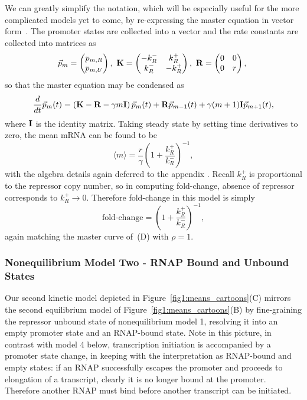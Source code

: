 We can greatly simplify the notation, which will be especially useful for the
more complicated models yet to come, by re-expressing the master equation in
vector form~\cite{Phillips2012}. The promoter states are collected into a vector
and the rate constants are collected into matrices as
\begin{equation}
\vec{p}_m = \begin{pmatrix} p_{m,R} \\ p_{m,U} \end{pmatrix},\
\mathbf{K} = \begin{pmatrix} -k_R^- & k_R^+ \\ k_R^- & -k_R^+ \end{pmatrix},\
\mathbf{R} = \begin{pmatrix} 0 & 0 \\ 0 & r \end{pmatrix},\
\label{eq:2state_cme_matrices}
\end{equation}
so that the master equation may be condensed as
\begin{equation}
\frac{d {}}{d t}\vec{p}_m(t) =
\left( \mathbf{K} - \mathbf{R} - \gamma m \mathbf{I} \right) \vec{p}_m(t)
                + \mathbf{R} \vec{p}_{m-1}(t)
                + \gamma (m+1) \mathbf{I} \vec{p}_{m+1}(t),
\label{eq:2state_rep_cme}
\end{equation}
where $\mathbf{I}$ is the identity matrix. Taking steady state by setting time
derivatives to zero, the mean mRNA can be found to be
\begin{equation}
\langle m \rangle = \frac{r}{\gamma}
        \left(1 + \frac{k_R^+}{k_R^-}\right)^{-1},
\end{equation}
with the algebra details again deferred to the appendix \mrm{cite specific
location}. Recall $k_R^+$ is proportional to the repressor copy number, so in
computing fold-change, absence of repressor corresponds to $k_R^+\rightarrow0$.
Therefore fold-change in this model is simply
\begin{equation}
\text{fold-change} = \left(1 + \frac{k_R^+}{k_R^-}\right)^{-1},
\end{equation}
again matching the master curve of~(D) with $\rho=1$.

\subsubsection{Nonequilibrium Model Two - RNAP Bound and Unbound States}
Our second kinetic model depicted in Figure~\ref{fig1:means_cartoons}(C) mirrors
the second equilibrium model of Figure~\ref{fig1:means_cartoons}(B) by
fine-graining  the repressor unbound state of nonequilibrium model 1, resolving
it into an empty promoter state and an RNAP-bound state. Note in this picture,
in contrast with model 4 below, transcription initiation is accompanied by a
promoter state change, in keeping with the interpretation as RNAP-bound and
empty states: if an RNAP successfully escapes the promoter and proceeds to
elongation of a transcript, clearly it is no longer bound at the promoter.
Therefore another RNAP must bind before another transcript can be initiated.

